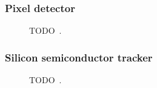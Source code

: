\FloatBarrier
\subsubsection{Pixel detector} 

\begin{figure}[ht]
  \caption{{\color{red}TODO}~\cite{Pequenao:1095925}.}
  \label{fig:pixel_cartoon}
\end{figure}


\FloatBarrier
\subsubsection{Silicon semiconductor tracker} 

\begin{figure}[ht]
  \caption{{\color{red}TODO}~\cite{Maximilien:883305}.}
  \label{fig:sct_photo}
\end{figure}


